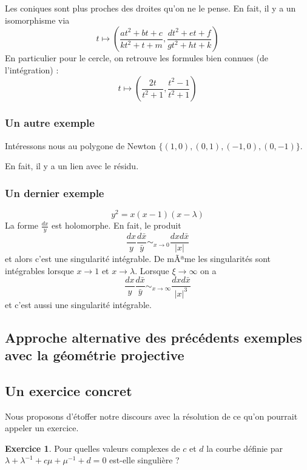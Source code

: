 \documentclass{article}
\theoremstyle{definition} %
\newtheorem{exo}{Exercice}
\newcommand{\1}{\mathbb{1}} %
\begin{document}
Les coniques sont plus proches des droites qu'on ne le pense.
En fait, il y a un isomorphisme via 
$$t \mapsto \left(\frac{at^2 + bt + c}{kt^2 + t + m},\frac{dt^2 + et + f}{gt^2 + ht + k}\right)$$
En particulier pour le cercle, on retrouve les formules bien connues (de l'intégration) :
$$t \mapsto \left(\frac{ 2t}{t^2+1},\frac{t^2-1}{t^2 +1}\right)$$

\subsubsection{Un autre exemple}

Intéressons nous au polygone de Newton $\{(1,0),(0,1),(-1,0),(0,-1)\}$.

En fait, il y a un lien avec le résidu.

\subsubsection{Un dernier exemple}

$$y^2=x(x-1)(x-
\lambda)$$
La forme $\displaystyle \frac{dx}{y}$ est holomorphe. En fait, le produit $$\frac{dx}{y} \frac{d\bar{x}}{\bar{y}}\mathop{\sim}_{x\to 0}\frac{dxd\bar{x}}{|x|}$$
et alors c'est une singularité intégrable. De mÃªme les singularités sont intégrables lorsque $x\to 1$ et $x\to \lambda$. Lorsque $\xi\to \infty$ on a
$$\frac{dx}{y} \frac{d\bar{x}}{\bar{y}}\mathop{\sim}_{x\to \infty}\frac{dxd\bar{x}}{|x|^3}$$
et c'est aussi une singularité intégrable.


\subsection{Approche alternative des précédents exemples avec la géométrie projective}

\subsection{Un exercice concret}

Nous proposons d'étoffer notre discours avec la résolution de ce qu'on pourrait appeler un exercice.

\begin{exo}
Pour quelles valeurs complexes de $c$ et $d$ la courbe définie par $\lambda + \lambda^{-1} + c \mu + \mu^{-1} + d =0$ est-elle singulière ?
\end{exo}
\end{document}

